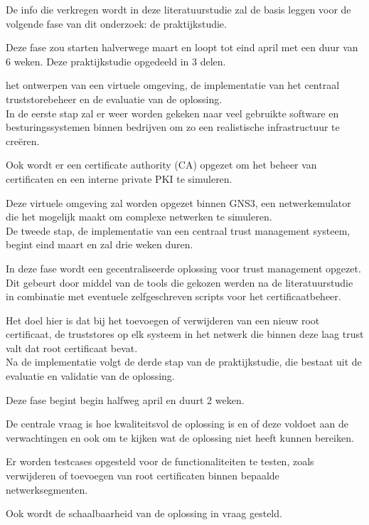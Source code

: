 De info die verkregen wordt in deze literatuurstudie zal de basis leggen voor de volgende fase van dit onderzoek: de praktijkstudie.

Deze fase zou starten halverwege maart en loopt tot eind april met een duur van 6 weken. Deze praktijkstudie opgedeeld in 3 delen.

het ontwerpen van een virtuele omgeving, de implementatie van het centraal truststorebeheer en de evaluatie van de oplossing. \\


In de eerste stap zal er weer worden gekeken naar veel gebruikte software en besturingssystemen binnen bedrijven om zo een realistische infrastructuur te creëren.

Ook wordt er een certificate authority (CA) opgezet om het beheer van certificaten en een interne private PKI te simuleren.

Deze virtuele omgeving zal worden opgezet binnen GNS3, een netwerkemulator die het mogelijk maakt om complexe netwerken te simuleren. \\


De tweede stap, de implementatie van een centraal trust management systeem, begint eind maart en zal drie weken duren.

In deze fase wordt een gecentraliseerde oplossing voor trust management opgezet. Dit gebeurt door middel van de tools die gekozen werden na de literatuurstudie in combinatie met eventuele zelfgeschreven scripts voor het certificaatbeheer.

Het doel hier is dat bij het toevoegen of verwijderen van een nieuw root certificaat, de truststores op elk systeem in het netwerk die binnen deze laag trust valt dat root certificaat bevat. \\


Na de implementatie volgt de derde stap van de praktijkstudie, die bestaat uit de evaluatie en validatie van de oplossing.

Deze fase begint begin halfweg april en duurt 2 weken.

De centrale vraag is hoe kwaliteitsvol de oplossing is en of deze voldoet aan de verwachtingen en ook om te kijken wat de oplossing niet heeft kunnen bereiken.

Er worden testcases opgesteld voor de functionaliteiten te testen, zoals verwijderen of toevoegen van root certificaten binnen bepaalde netwerksegmenten.

Ook wordt de schaalbaarheid van de oplossing in vraag gesteld.

